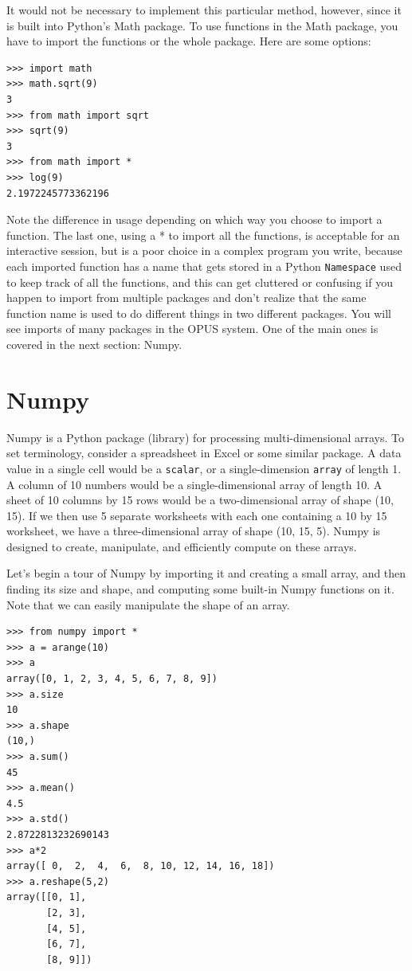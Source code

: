 It would not be necessary to implement this particular method, however, since it is built into Python's Math package.  To use functions in the Math package, you have to import the functions or the whole package.  Here are some options:

\begin{lstlisting}
>>> import math
>>> math.sqrt(9)
3
>>> from math import sqrt
>>> sqrt(9)
3
>>> from math import *
>>> log(9)
2.1972245773362196
\end{lstlisting}

Note the difference in usage depending on which way you choose to import a function.  The last one, using a * to import all the functions, is acceptable for an interactive session, but is a poor choice in a complex program you write, because each imported function has a name that gets stored in a Python \verb#Namespace# used to keep track of all the functions, and this can get cluttered or confusing if you happen to import from multiple packages and don't realize that the same function name is used to do different things in two different packages. You will see imports of many packages in the OPUS system.  One of the main ones is covered in the next section: Numpy.


\section{Numpy}
\label{sec:numpy}

Numpy is a Python package (library) for processing multi-dimensional arrays.  To set terminology, consider a spreadsheet in Excel or some similar package.  A data value in a single cell would be a \verb#scalar#, or a single-dimension \verb#array# of length 1.  A column of 10 numbers would be a single-dimensional array of length 10.  A sheet of 10 columns by 15 rows would be a two-dimensional array of shape (10, 15).  If we then use 5 separate worksheets with each one containing a 10 by 15 worksheet, we have a three-dimensional array of shape (10, 15, 5).  Numpy is designed to create, manipulate, and efficiently compute on these arrays.

Let's begin a tour of Numpy by importing it and creating a small array,  and then finding its size and shape, and computing some built-in Numpy functions on it. Note that we can easily manipulate the shape of an array.

\begin{lstlisting}
>>> from numpy import *
>>> a = arange(10)
>>> a
array([0, 1, 2, 3, 4, 5, 6, 7, 8, 9])
>>> a.size
10
>>> a.shape
(10,)
>>> a.sum()
45
>>> a.mean()
4.5
>>> a.std()
2.8722813232690143
>>> a*2
array([ 0,  2,  4,  6,  8, 10, 12, 14, 16, 18])
>>> a.reshape(5,2)
array([[0, 1],
       [2, 3],
       [4, 5],
       [6, 7],
       [8, 9]])
\end{lstlisting}

